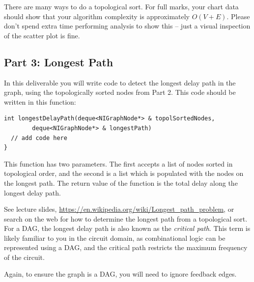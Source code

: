 There are many ways to do a topological sort.  For full marks, your chart data should show that your algorithm complexity is approximately $O(V+E)$.  Please don't spend extra time performing analysis to show this -- just a visual inspection of the scatter plot is fine.


\subsection{Part 3: Longest Path}
\label{sec:del3}
In this deliverable you will write code to detect the longest delay path in the graph, using the topologically sorted nodes from Part 2.  This code should be written in this function:
\begin{lstlisting}
int longestDelayPath(deque<NIGraphNode*> & topolSortedNodes,
		deque<NIGraphNode*> & longestPath)
  // add code here
}
\end{lstlisting}
This function has two parameters.  The first accepts a list of nodes sorted in topological order, and the second is a list which is populated with the nodes on the longest path.  The return value of the function is the total delay along the longest delay path.

See lecture slides, \url{https://en.wikipedia.org/wiki/Longest_path_problem}, or search on the web for how to determine the longest path from a topological sort. For a DAG, the longest delay path is also known as the \emph{critical path}.  This term is likely familiar to you in the circuit domain, as combinational logic can be represented using a DAG, and the critical path restricts the maximum frequency of the circuit.  

Again, to ensure the graph is a DAG, you will need to ignore feedback edges.

